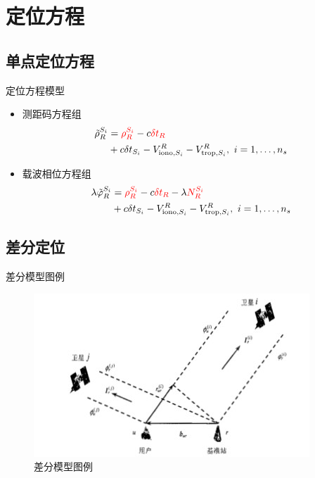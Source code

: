 \section{定位方程}
\subsection{单点定位方程}
\begin{frame}{定位方程模型}
    \begin{itemize}
        \item 测距码方程组
        \begin{align*}
            \tilde \rho _ R ^ { S _ i } &= \textcolor{red}{ \rho _ R ^ { S _ i } } - c \textcolor{red}{ \delta t _ R } \\
            &+ c \delta t _ { S _ i } - V _ { \mathrm{ iono }, S _ i } ^ R - V _ { \mathrm{ trop }, S _ i } ^ R, \
            i = 1, \ldots, n _ s
        \end{align*}
        \item 载波相位方程组
        \begin{align*}
            \lambda \tilde \varphi _ R ^ { S _ i } &= \textcolor{red}{ \rho _ R ^ { S _ i } } - c
            \textcolor{red}{ \delta t _ R } - \lambda \textcolor{red}{ N _ R ^ { S _ i } } \\
            &+ c \delta t _ { S _ i } - V _ { \mathrm{ iono }, S _ i } ^ R - V _ { \mathrm{ trop }, S _ i } ^ R, \
            i = 1, \ldots, n _ s
        \end{align*}
    \end{itemize}
\end{frame}

\subsection{差分定位}
\begin{frame}{差分模型图例}
    \begin{figure}
        \centering
        \includegraphics[width = .7\textwidth]{pic/single_double_diff.jpg}
        \caption{差分模型图例}
        \label{fig:single_double_diff}
    \end{figure}
\end{frame}

